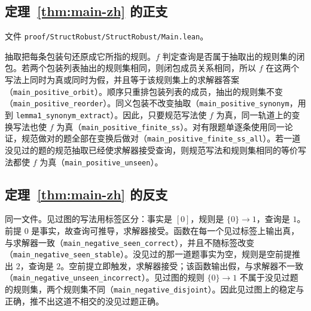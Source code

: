 \documentclass[UTF8,11pt,a4paper]{ctexart}
\theoremstyle{plain}
\begin{document}
\subsection{定理~\ref{thm:main-zh} 的正支}

文件 \texttt{proof/StructRobust/StructRobust/Main.lean}。

抽取把每条包装句还原成它所指的规则。$f$ 判定查询是否属于抽取出的规则集的闭包。若两个包装列表抽出的规则集相同，则闭包成员关系相同，所以 $f$ 在这两个写法上同时为真或同时为假，并且等于该规则集上的求解器答案（\texttt{main\_positive\_orbit}）。顺序只重排包装列表的成员，抽出的规则集不变（\texttt{main\_positive\_reorder}）。同义包装不改变抽取（\texttt{main\_positive\_synonym}，用到 \texttt{lemma1\_synonym\_extract}）。因此，只要规范写法使 $f$ 为真，同一轨道上的变换写法也使 $f$ 为真（\texttt{main\_positive\_finite\_ss}）。对有限题单逐条使用同一论证，规范做对的题全部在变换后做对（\texttt{main\_positive\_finite\_ss\_all}）。若一道没见过的题的规范抽取已经使求解器接受查询，则规范写法和规则集相同的等价写法都使 $f$ 为真（\texttt{main\_positive\_unseen}）。

\subsection{定理~\ref{thm:main-zh} 的反支}

同一文件。见过图的写法用标签区分：事实是 $[0]$，规则是 $\{0\}\to 1$，查询是 $1$。前提 $0$ 是事实，故查询可推导，求解器接受。函数在每一个见过标签上输出真，与求解器一致（\texttt{main\_negative\_seen\_correct}），并且不随标签改变（\texttt{main\_negative\_seen\_stable}）。没见过的那一道题事实为空，规则是空前提推出 $2$，查询是 $2$。空前提立即触发，求解器接受；该函数输出假，与求解器不一致（\texttt{main\_negative\_unseen\_incorrect}）。见过图的规则 $\{0\}\to 1$ 不属于没见过题的规则集，两个规则集不同（\texttt{main\_negative\_disjoint}）。因此见过图上的稳定与正确，推不出这道不相交的没见过题正确。
\end{document}
